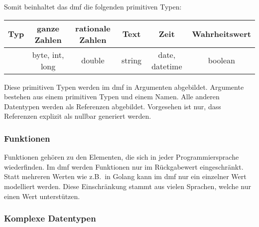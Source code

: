 \documentclass[./einleitung.tex]{subfiles}
\begin{document}
    Somit beinhaltet das \acrshort{dmf} die folgenden primitiven Typen:

    \begin{center}
        \begin{tabular}{| c || c | c | c | c | c |}
            \hline
            Typ & ganze Zahlen & rationale Zahlen & Text & Zeit & Wahrheitswert \\
            \hline
            & byte, int, long & double & string & date, datetime & boolean \\
            \hline
        \end{tabular}
    \end{center}

    Diese primitiven Typen werden im \acrshort{dmf} in Argumenten abgebildet.
    Argumente bestehen aus einem primitiven Typen und einem Namen.
    Alle anderen Datentypen werden als Referenzen abgebildet.
    Vorgesehen ist nur, dass Referenzen explizit als nullbar generiert werden.

    \subsubsection{Funktionen}
    Funktionen gehören zu den Elementen, die sich in jeder Programmiersprache wiederfinden.
    Im \acrshort{dmf} werden Funktionen nur im Rückgabewert eingeschränkt.
    Statt mehreren Werten wie z.B.\ in Golang kann im \acrshort{dmf} nur ein einzelner Wert modelliert werden.
    Diese Einschränkung stammt aus vielen Sprachen, welche nur einen Wert unterstützen.

    \subsubsection{Komplexe Datentypen}
\end{document}
